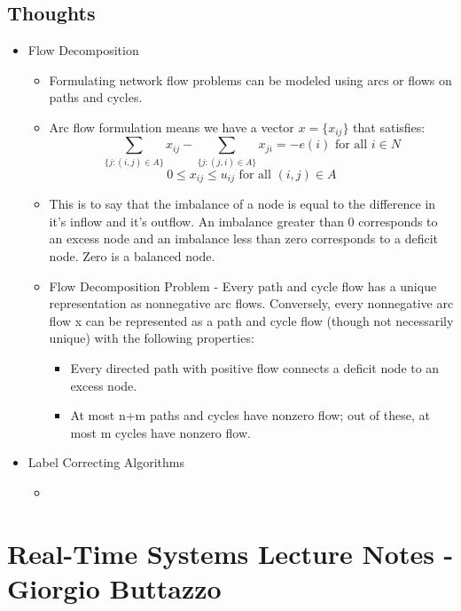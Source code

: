 \documentclass{article}
\begin{document}
\subsection{Thoughts}
\begin{itemize}
    \item Flow Decomposition
    \begin{itemize}
        \item Formulating network flow problems can be modeled using arcs or flows on paths and cycles.
	\item Arc flow formulation means we have a vector $x=\{x_{ij}\}$ that satisfies:
		$$\sum_{\{j:(i,j) \in A\}} x_{ij} - \sum_{\{j:(j,i) \in A\}} x_{ji} = -e(i) \text{   for all } i \in N$$
		$$0 \leq x_{ij} \leq u_{ij} \text{   for all } (i,j) \in A$$
        \item This is to say that the imbalance of a node is equal to the difference in it's inflow and it's outflow.  An imbalance greater than 0 corresponds to an excess node and an imbalance less than zero corresponds to a deficit node.  Zero is a balanced node.
	\item Flow Decomposition Problem - Every path and cycle flow has a unique representation as nonnegative arc flows.  Conversely, every nonnegative arc flow x can be represented as a path and cycle flow (though not necessarily unique) with the following properties:
	\begin{itemize}
	    \item Every directed path with positive flow connects a deficit node to an excess node.
            \item At most n+m paths and cycles have nonzero flow; out of these, at most m cycles have nonzero flow.
	\end{itemize}
    \end{itemize}
    \item Label Correcting Algorithms
    \begin{itemize}
        \item 
    \end{itemize}
\end{itemize}


\section{Real-Time Systems Lecture Notes - Giorgio Buttazzo}
\end{document}
